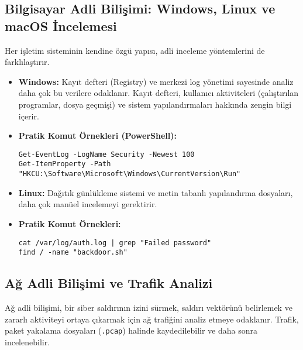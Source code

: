 \subsection{Bilgisayar Adli Bilişimi: Windows, Linux ve macOS İncelemesi}

Her işletim sisteminin kendine özgü yapısı, adli inceleme yöntemlerini de farklılaştırır.

\begin{itemize}
    \item \textbf{Windows:} Kayıt defteri (Registry) ve merkezi log yönetimi sayesinde analiz daha çok bu verilere odaklanır. Kayıt defteri, kullanıcı aktiviteleri (çalıştırılan programlar, dosya geçmişi) ve sistem yapılandırmaları hakkında zengin bilgi içerir.
    \item \textbf{Pratik Komut Örnekleri (PowerShell):}
    \begin{verbatim}
Get-EventLog -LogName Security -Newest 100
Get-ItemProperty -Path "HKCU:\Software\Microsoft\Windows\CurrentVersion\Run"
    \end{verbatim}
    \item \textbf{Linux:} Dağıtık günlükleme sistemi ve metin tabanlı yapılandırma dosyaları, daha çok manüel incelemeyi gerektirir.
    \item \textbf{Pratik Komut Örnekleri:}
    \begin{verbatim}
cat /var/log/auth.log | grep "Failed password"
find / -name "backdoor.sh"
    \end{verbatim}
\end{itemize}

\subsection{Ağ Adli Bilişimi ve Trafik Analizi}

Ağ adli bilişimi, bir siber saldırının izini sürmek, saldırı vektörünü belirlemek ve zararlı aktiviteyi ortaya çıkarmak için ağ trafiğini analiz etmeye odaklanır. Trafik, paket yakalama dosyaları (\texttt{.pcap}) halinde kaydedilebilir ve daha sonra incelenebilir.

